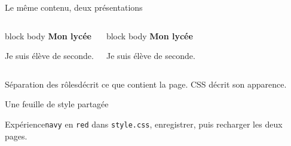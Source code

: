 \documentclass[aspectratio=169,11pt]{beamer}
\newcommand{\etiquette}[1]{{\color{or}\small\MakeUppercase{#1}}}
\begin{document}
\begin{frame}{Le même contenu, deux présentations}
  \begin{columns}
  \begin{beamercolorbox}[rounded=true,sep=12pt]{block body}
  {\color{blue}\Large\bfseries Mon lycée}\par\vspace{4mm}
  {\color{black}Je suis élève de seconde.}
  \end{beamercolorbox}
  \centering\etiquette{Style A}
  \begin{beamercolorbox}[rounded=true,sep=12pt]{block body}
  {\color{red}\Large\bfseries Mon lycée}\par\vspace{4mm}
  {\color{black}\large Je suis élève de seconde.}
  \end{beamercolorbox}
  \centering\etiquette{Style B}
  \end{columns}
  \vspace{12mm}\pause
  \begin{block}{Séparation des rôles}\HTML décrit ce que contient la page. CSS décrit son apparence.\end{block}
\end{frame}

\begin{frame}{Une feuille de style partagée}
  \begin{center}
  \end{center}
  \vspace{4mm}
  \begin{block}{Expérience}\Changer \texttt{navy} en \texttt{red} dans \texttt{style.css}, enregistrer, puis recharger les deux pages.\end{block}
\end{frame}
\end{document}
